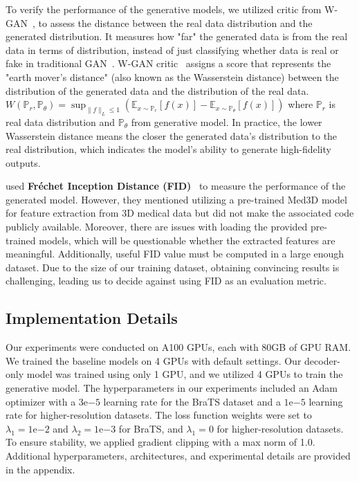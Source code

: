 \documentclass[letterpaper]{article} %
\begin{document}
To verify the performance of the generative models, we utilized critic from W-GAN~\cite{Arjovsky2017WassersteinG}, to assess the distance between the real data distribution and the generated distribution. It measures how "far" the generated data is from the real data in terms of distribution, instead of just classifying whether data is real or fake in traditional GAN~\cite{goodfellow2020generative}. W-GAN critic~\cite{Arjovsky2017WassersteinG} assigns a score that represents the "earth mover’s distance" (also known as the Wasserstein distance) between the distribution of the generated data and the distribution of the real data. 
    $W(\mathbb{P}_r, \mathbb{P}_\theta) = \sup_{\|f\|_L \leq 1} \left( \mathbb{E}_{x \sim \mathbb{P}_r} [f(x)] - \mathbb{E}_{x \sim \mathbb{P}_\theta} [f(x)] \right)$
where $\mathbb{P}_r$ is real data distribution and $\mathbb{P}_\theta$ from generative model.
In practice, the lower Wasserstein distance means the closer the generated data's distribution to the real distribution, which indicates the model's ability to generate high-fidelity outputs. 

\cite{Pinaya2022BrainIG} used {\bf Fréchet Inception Distance (FID)}~\cite{heusel2017gans} to measure the performance of the generated model. However, they mentioned utilizing a pre-trained Med3D model~\cite{chen2019med3d} for feature extraction from 3D medical data but did not make the associated code publicly available. Moreover, there are issues with loading the provided pre-trained models, which will be questionable whether the extracted features are meaningful. Additionally, useful FID value must be computed in a large enough dataset. Due to the size of our training dataset, obtaining convincing results is challenging, leading us to decide against using FID as an evaluation metric.

\subsection{Implementation Details}
Our experiments were conducted on A100 GPUs, each with 80GB of GPU RAM. We trained the baseline models on 4 GPUs with default settings. Our decoder-only model was trained using only 1 GPU, and we utilized 4 GPUs to train the generative model. The hyperparameters in our experiments included an Adam optimizer with a $3\mathrm{e}{-5}$ learning rate for the BraTS dataset and a $1\mathrm{e}{-5}$ learning rate for higher-resolution datasets. The loss function weights were set to $\lambda_1=1\mathrm{e}{-2}$ and $\lambda_2=1\mathrm{e}{-3}$ for BraTS, and $\lambda_1=0$ for higher-resolution datasets. To ensure stability, we applied gradient clipping with a max norm of 1.0. Additional hyperparameters, architectures, and experimental details are provided in the appendix.
\end{document}
